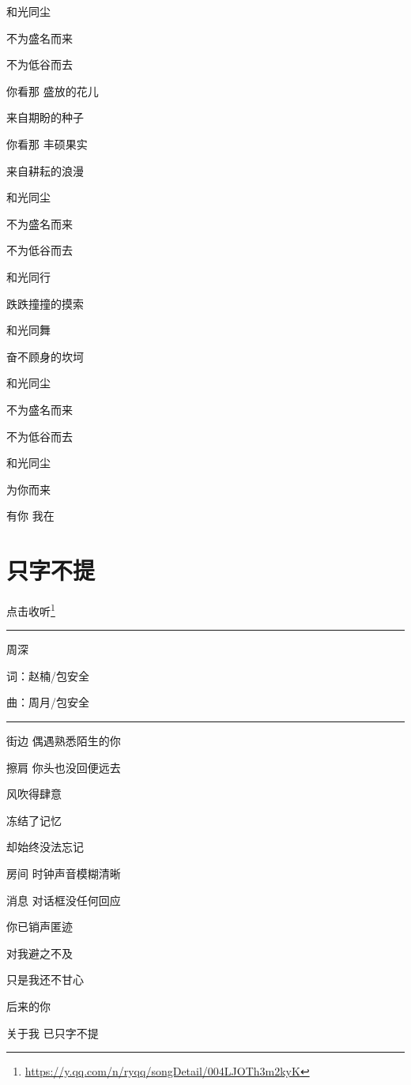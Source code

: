 \documentclass[]{ctexbook}
\renewcommand{\href}[2]{#2\footnote{\url{#1}}}
\begin{document}
和光同尘

不为盛名而来

不为低谷而去

你看那 盛放的花儿

来自期盼的种子

你看那 丰硕果实

来自耕耘的浪漫

和光同尘

不为盛名而来

不为低谷而去

和光同行

跌跌撞撞的摸索

和光同舞

奋不顾身的坎坷

和光同尘

不为盛名而来

不为低谷而去

和光同尘

为你而来

有你 我在

\section*{只字不提}\label{nothing-to-say}


\href{https://y.qq.com/n/ryqq/songDetail/004LJOTh3m2kyK}{点击收听}

\begin{center}\rule{0.5\linewidth}{0.5pt}\end{center}

周深

词：赵楠/包安全

曲：周月/包安全

\begin{center}\rule{0.5\linewidth}{0.5pt}\end{center}

街边 偶遇熟悉陌生的你

擦肩 你头也没回便远去

风吹得肆意

冻结了记忆

却始终没法忘记

房间 时钟声音模糊清晰

消息 对话框没任何回应

你已销声匿迹

对我避之不及

只是我还不甘心

后来的你

关于我 已只字不提
\end{document}
